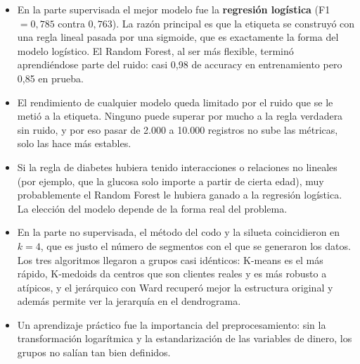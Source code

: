 \documentclass[11pt,letterpaper]{article}
\begin{document}
\begin{itemize}
  \item En la parte supervisada el mejor modelo fue la \textbf{regresión logística} (F1 $=0{,}785$ contra
        $0{,}763$). La razón principal es que la etiqueta se construyó con una regla lineal pasada por una
        sigmoide, que es exactamente la forma del modelo logístico. El Random Forest, al ser más flexible,
        terminó aprendiéndose parte del ruido: casi 0,98 de accuracy en entrenamiento pero 0,85 en prueba.
  \item El rendimiento de cualquier modelo queda limitado por el ruido que se le metió a la etiqueta. Ninguno
        puede superar por mucho a la regla verdadera sin ruido, y por eso pasar de 2.000 a 10.000 registros
        no sube las métricas, solo las hace más estables.
  \item Si la regla de diabetes hubiera tenido interacciones o relaciones no lineales (por ejemplo, que la
        glucosa solo importe a partir de cierta edad), muy probablemente el Random Forest le hubiera ganado a
        la regresión logística. La elección del modelo depende de la forma real del problema.
  \item En la parte no supervisada, el método del codo y la silueta coincidieron en $k=4$, que es justo el
        número de segmentos con el que se generaron los datos. Los tres algoritmos llegaron a grupos casi
        idénticos: K-means es el más rápido, K-medoids da centros que son clientes reales y es más robusto a
        atípicos, y el jerárquico con Ward recuperó mejor la estructura original y además permite ver la
        jerarquía en el dendrograma.
  \item Un aprendizaje práctico fue la importancia del preprocesamiento: sin la transformación logarítmica y
        la estandarización de las variables de dinero, los grupos no salían tan bien definidos.
\end{itemize}
\end{document}
